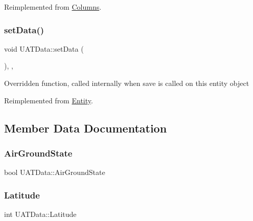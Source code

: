 Reimplemented from \mbox{\hyperlink{classColumns_aeb2cbb10de5358d5c1f411f327324c94}{Columns}}.

\mbox{\label{classUATData_a969aa1661ec27cd3b85999fc61403a0e}} 
\subsubsection{\texorpdfstring{set\+Data()}{setData()}}
{\footnotesize\ttfamily void U\+A\+T\+Data\+::set\+Data (\begin{DoxyParamCaption}{ }\end{DoxyParamCaption})\hspace{0.3cm}{\ttfamily [inline]}, {\ttfamily [override]}, {\ttfamily [virtual]}}

Overridden function, called internally when save is called on this entity object 

Reimplemented from \mbox{\hyperlink{classEntity_a0f8088e06ee1aae86e0a8049e371692f}{Entity}}.



\subsection{Member Data Documentation}
\mbox{\label{classUATData_a8c2ca1eae7147dfdc99d2ea5b83a1763}} 
\subsubsection{\texorpdfstring{Air\+Ground\+State}{AirGroundState}}
{\footnotesize\ttfamily bool U\+A\+T\+Data\+::\+Air\+Ground\+State}

\mbox{\label{classUATData_afa9b129b79280003eb7089447d77bf6d}} 
\subsubsection{\texorpdfstring{Latitude}{Latitude}}
{\footnotesize\ttfamily int U\+A\+T\+Data\+::\+Latitude}

